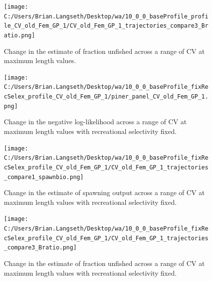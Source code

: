 \documentclass[11pt,
  english,
  a4paper,
]{article}
\begin{document}
\tagmcend\tagstructend


\begin{figure}
\centering
\texttt{[image: C:/Users/Brian.Langseth/Desktop/wa/10\_0\_0\_baseProfile\_profile\_CV\_old\_Fem\_GP\_1/CV\_old\_Fem\_GP\_1\_trajectories\_compare3\_Bratio.png]}
\caption{Change in the estimate of fraction unfished across a range of CV at maximum length values.\label{fig:cv2-depl}}
\end{figure}

\tagmcend\tagstructend


\begin{figure}
\centering
\texttt{[image: C:/Users/Brian.Langseth/Desktop/wa/10\_0\_0\_baseProfile\_fixRecSelex\_profile\_CV\_old\_Fem\_GP\_1/piner\_panel\_CV\_old\_Fem\_GP\_1.png]}
\caption{Change in the negative log-likelihood across a range of CV at maximum length values with recreational selectivity fixed.\label{fig:cv2-recfix-profile}}
\end{figure}

\tagmcend\tagstructend


\begin{figure}
\centering
\texttt{[image: C:/Users/Brian.Langseth/Desktop/wa/10\_0\_0\_baseProfile\_fixRecSelex\_profile\_CV\_old\_Fem\_GP\_1/CV\_old\_Fem\_GP\_1\_trajectories\_compare1\_spawnbio.png]}
\caption{Change in the estimate of spawning output across a range of CV at maximum length values with recreational selectivity fixed.\label{fig:cv2-recfix-ssb}}
\end{figure}

\tagmcend\tagstructend


\begin{figure}
\centering
\texttt{[image: C:/Users/Brian.Langseth/Desktop/wa/10\_0\_0\_baseProfile\_fixRecSelex\_profile\_CV\_old\_Fem\_GP\_1/CV\_old\_Fem\_GP\_1\_trajectories\_compare3\_Bratio.png]}
\caption{Change in the estimate of fraction unfished across a range of CV at maximum length values with recreational selectivity fixed.\label{fig:cv2-recfix-depl}}
\end{figure}
\end{document}
